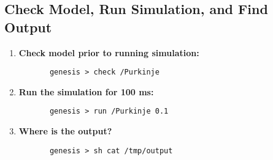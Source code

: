 \documentclass[12pt]{article}
\begin{document}
\subsection*{Check Model, Run Simulation, and Find Output}

\begin{enumerate}
         \item{\bf Check model prior to running simulation:}
	\begin{verbatim}
	   genesis > check /Purkinje
	\end{verbatim}
	
	\item{\bf Run the simulation for 100 ms:}
	\begin{verbatim}
	   genesis > run /Purkinje 0.1
	\end{verbatim}
	
	\item{\bf Where is the output?}
	\begin{verbatim}
	   genesis > sh cat /tmp/output
	\end{verbatim}
\end{enumerate}
\end{document}
